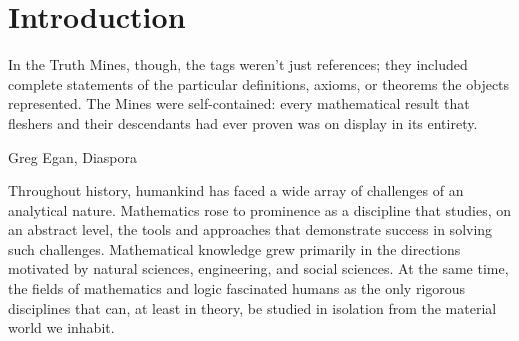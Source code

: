 
\chapter{Introduction}




\epigraph{In the Truth Mines, though, the tags weren't just references; they included complete statements of the particular definitions, axioms, or theorems the objects represented. The Mines were self-contained: every mathematical result that fleshers and their descendants had ever proven was on display in its entirety.}{Greg Egan, Diaspora}




Throughout history, humankind has faced a wide array of challenges of an analytical nature.
Mathematics rose to prominence as a discipline that studies, on an abstract level, the tools and approaches that demonstrate success in solving such challenges.
Mathematical knowledge grew primarily in the directions motivated by
natural sciences, engineering, and social sciences.
At the same time, the fields of mathematics and logic
fascinated humans
as the only rigorous disciplines that can, at least in theory, be studied in isolation from the material world we inhabit.

